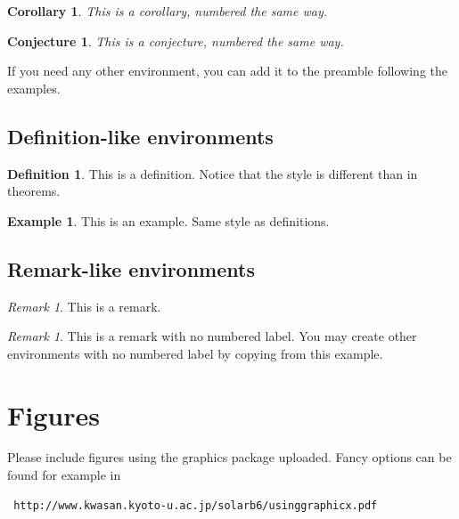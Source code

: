 \documentclass[12,twoside]{TFG-GM}
\newtheorem{corollary}[theorem]{Corollary}
\newtheorem{conjecture}[theorem]{Conjecture}
\theoremstyle{definition}
\newtheorem{definition}[theorem]{Definition}
\newtheorem{example}[theorem]{Example}
\theoremstyle{remark}
\newtheorem{remark}[theorem]{Remark}
\newtheorem*{remarknonumber}{Remark}
\begin{document}
\begin{corollary}
This is a corollary, numbered the same way.
\end{corollary}

\begin{conjecture}
This is a conjecture, numbered the same way.
\end{conjecture}

If you need any other environment, you can add it to the preamble following the examples.

\subsection{Definition-like environments}

\begin{definition}
This is a definition. Notice that the style is different than in theorems.
\end{definition}

\begin{example}
This is an example. Same style as definitions.
\end{example}

\subsection{Remark-like environments}

\begin{remark}
This is a remark. 
\end{remark}

\begin{remarknonumber}
This is a remark with no numbered label. You may create other environments with no numbered label by copying from this example.
\end{remarknonumber}

\section{Figures}

Please include figures using the graphics package uploaded.  Fancy options can be found for example in  \begin{verbatim} http://www.kwasan.kyoto-u.ac.jp/solarb6/usinggraphicx.pdf \end{verbatim}
\end{document}
